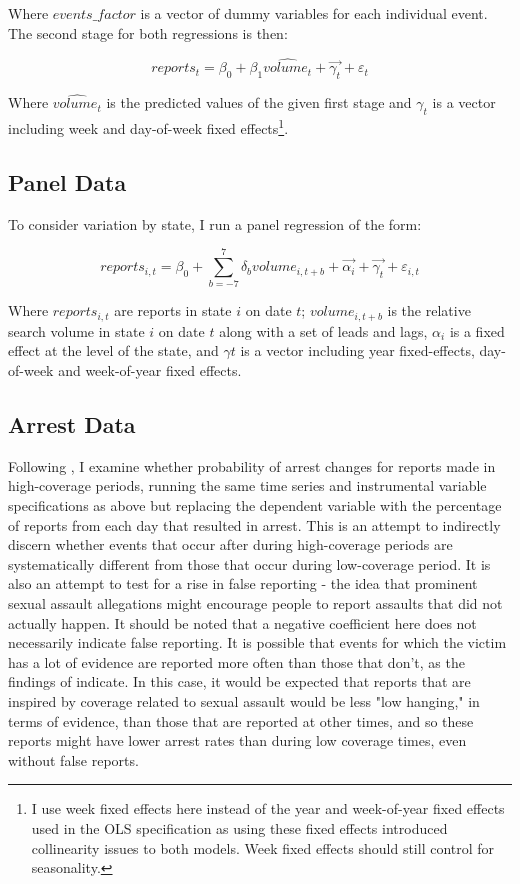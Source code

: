 \documentclass[AER,draftmode]{AEA}
\begin{document}
Where $events\_factor$ is a vector of dummy variables for each individual event. The second stage for both regressions is then:

$$ 
reports_{t} = \beta_{0} + \beta_1 \hat{volume_{t}} + \vec{\gamma_{t}} + \varepsilon_{t}
$$

Where $\hat{volume_t}$ is the predicted values of the given first stage and $\gamma_{t}$ is a vector including week and day-of-week fixed effects\footnote{I use week fixed effects here instead of the year and week-of-year fixed effects used in the OLS specification as using these fixed effects introduced collinearity issues to both models. Week fixed effects should still control for seasonality.}.

\subsection{Panel Data}

To consider variation by state, I run a panel regression of the form:

$$ 
reports_{i,t} = \beta_{0} + \sum_{b=-7}^{7} \delta_{b} volume_{i,t+b} + \vec{\alpha_{i}} + \vec{\gamma_{t}} + \varepsilon_{i,t}
$$

Where $reports_{i,t}$ are reports in state $i$ on date $t$; $volume_{i,t+b}$ is the relative search volume in state $i$ on date $t$ along with a set of leads and lags, $\alpha_{i}$ is a fixed effect at the level of the state, and $\gamma{t}$ is a vector including year fixed-effects, day-of-week and week-of-year fixed effects. 

\subsection{Arrest Data}

Following , I examine whether probability of arrest changes for reports made in high-coverage periods, running the same time series and instrumental variable specifications as above but replacing the dependent variable with the percentage of reports from each day that resulted in arrest. This is an attempt to indirectly discern whether events that occur after during high-coverage periods are systematically different from those that occur during low-coverage period. It is also an attempt to test for a rise in false reporting - the idea that prominent sexual assault allegations might encourage people to report assaults that did not actually happen. It should be noted that a negative coefficient here does not necessarily indicate false reporting. It is possible that events for which the victim has a lot of evidence are reported more often than those that don't, as the findings of  indicate. In this case, it would be expected that reports that are inspired by coverage related to sexual assault would be less "low hanging," in terms of evidence, than those that are reported at other times, and so these reports might have lower arrest rates than during low coverage times, even without false reports.
\end{document}
